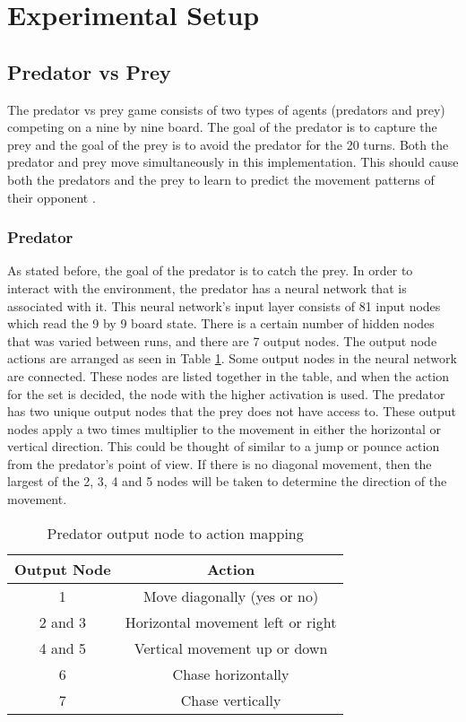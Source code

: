 
\section{Experimental Setup} \label{sec:exp-setup}
\subsection{Predator vs Prey}
	The predator vs prey game consists of two types of agents (predators and prey) competing on a nine by nine board. The goal of the predator is to capture the prey and the goal of the prey is to avoid the predator for the 20 turns.  Both the predator and prey move simultaneously in this implementation. This should cause both the predators and the prey to learn to predict the movement patterns of their opponent .
	
\subsubsection{Predator}
  As stated before, the goal of the predator is to catch the prey. In order to interact with the environment, the predator has a neural network that is associated with it. This neural network’s input layer consists of 81 input nodes which read the 9 by 9 board state. There is a certain number of hidden nodes that was varied between runs, and there are 7 output nodes. The output node actions are arranged as seen in Table \ref{tab:pred-actions}. Some output nodes in the neural network are connected. These nodes are listed together in the table, and when the action for the set is decided, the node with the higher activation is used. The predator has two unique output nodes that the prey does not have access to. These output nodes apply a two times multiplier to the movement in either the horizontal or vertical direction. This could be thought of similar to a jump or pounce action from the predator's point of view. If there is no diagonal movement, then the largest of the 2, 3, 4 and 5 nodes will be taken to determine the direction of the movement.
				
\begin{table}
  \centering
  \begin{tabular}{|c|c|}
    \hline
    Output Node & Action \\
    \hline
    1 & Move diagonally (yes or no)\\
    2 and 3 & Horizontal movement left or right \\
    4 and 5 & Vertical movement up or down \\
    6 & Chase horizontally \\
    7 & Chase vertically \\
    \hline
  \end{tabular}
  \caption{Predator output node to action mapping}
  \label{tab:pred-actions}
\end{table}

